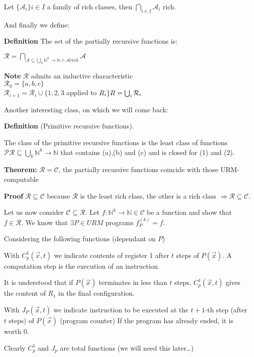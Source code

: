 \documentclass{amsbook}
\newcommand{\nat}{\ensuremath{\mathbb{N}}}
\theoremstyle{definition}
\theoremstyle{remark}
\numberwithin{section}{chapter}
\numberwithin{equation}{chapter}
\begin{document}
Let $\{\mathcal{A}_i\}i\in I$ a family of rich classes, then $\bigcap_{i\in I}\mathcal{A}_i$ rich.

And finally we define:

\textbf{Definition} The set of the partially recursive functions is:

$\mathcal{R} = \bigcap_{\mathcal{A} \subseteq \bigcup_k \nat^k\rightarrow\nat
		\land
		\mathcal{A}rich} \mathcal{A}$

\textbf{Note} $\mathcal{R}$ admits an inductive characteristic\\
$\mathcal{R}_0 = \{a,b,c\}$\\
$\mathcal{R}_{i+1} = \mathcal{R}_i \cup \{1,2,3 $ applied to $ R_i\}\\
	R = \bigcup_i \mathcal{R}_i$

Another interesting class, on which we will come back:

\textbf{Definition} (Primitive recursive functions).

The class of the primitive recursive functions is the least class of functions $\mathcal{PR}\subseteq \bigcup_k\nat^k\rightarrow\nat$ that contains (a),(b) and (c) and is closed for (1) and (2).

\textbf{Theorem:} $\mathcal{R} = \mathcal{C}$, the partially recursive functions coincide with those URM-computable

\textbf{Proof} $ \mathcal{R} \subseteq \mathcal{C} $ because $\mathcal{R}$ is the least rich class, the other is a rich class $\Rightarrow \mathcal{R}\subseteq\mathcal{C}$.

Let us now consider $ \mathcal{C} \subseteq \mathcal{R} $. Let $ f:\nat^k\rightarrow\nat \in \mathcal{C} $ be a function and show that $ f \in \mathcal{R} $. We know that $ \exists P \in URM $ programs $ f_P^{(k)} = f$.

Considering the following functions (dependant on $P$)

With $ C_p^1(\vec{x}, t) $ we indicate contents of register 1 after $t$ steps of $ P(\vec{x}) $. A computation step is the execution of an instruction.

It is understood that if $P(\vec{x})$ terminates in less than $t$ steps, $ C_p^1(\vec{x}, t) $ gives the content of $R_1$ in the final configuration.

With $ J_P(\vec{x},t) $ we indicate instruction to be executed at the $t+1$-th step (after $t$ steps) of $P(\vec{x})$ (program counter) If the program has already ended, it is worth 0.

Clearly $C_p^1$ and $J_p$ are total functions (we will need this later\dots)
\end{document}
